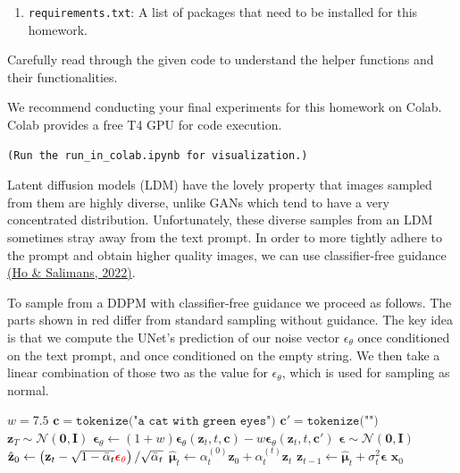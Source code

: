 \documentclass[11pt,addpoints,answers]{exam}
\newcommand{\Nc}{\mathcal{N}}
\newcommand{\cv}{\mathbf{c}}
\newcommand{\xv}{\mathbf{x}}
\newcommand{\zv}{\mathbf{z}}
\newcommand{\Iv}{\mathbf{I}}
\newcommand{\epsilonv   }{\boldsymbol \epsilon   }
\newcommand{\muv        }{\boldsymbol \mu        }
\begin{document}
\begin{questions}
\begin{enumerate}
    \item \lstinline{requirements.txt}: A list of packages that need to be installed for this homework.

\end{enumerate}

Carefully read through the given code to understand the helper functions and their functionalities. 


We recommend conducting your final experiments for this homework on Colab. Colab provides a free T4 GPU for code execution. 
\begin{lstlisting}
(Run the run_in_colab.ipynb for visualization.)
\end{lstlisting}



Latent diffusion models (LDM) have the lovely property that images sampled from them are highly diverse, unlike GANs which tend to have a very concentrated distribution. Unfortunately, these diverse samples from an LDM sometimes stray away from the text prompt. In order to more tightly adhere to the prompt and obtain higher quality images, we can use classifier-free guidance \href{https://arxiv.org/pdf/2207.12598}{(Ho \& Salimans, 2022)}.

To sample from a DDPM with classifier-free guidance we proceed as follows. The parts shown in red differ from standard sampling without guidance. The key idea is that we compute the UNet's prediction of our noise vector $\epsilon_{\theta}$ once conditioned on the text prompt, and once conditioned on the empty string. We then take a linear combination of those two as the value for $\epsilon_{\theta}$, which is used for sampling as normal. 
\begin{algorithm}[H]
\caption{Sampling from DDPM with Classifier-free Guidance}
\begin{algorithmic}[1]
\State \color{red} $w = 7.5$ 
\State $\cv = \texttt{tokenize("a cat with green eyes")}$ 
\State $\cv' = \texttt{tokenize("")}$  \color{black}
\State $\zv_T \sim \Nc(\mathbf{0}, \Iv)$
    \State \color{red} $\epsilonv_{\theta} \gets (1 + w) \epsilonv_{\theta}(\zv_t, t, \cv) - w \epsilonv_{\theta}(\zv_t, t, \cv') $ \color{black}
    \State $\epsilonv \sim \Nc(\mathbf{0}, \Iv)$
    \State $\hat{\zv}_0 \gets \left( \zv_t - \sqrt{1-\bar{\alpha}_t} {\color{red} \epsilonv_{\theta} } \right) / \sqrt{\bar{\alpha}_t}$ 
    \State $\hat{\muv}_t \gets  \alpha_t^{(0)} \hat{\zv}_0 + \alpha_t^{(t)} \zv_t $ 
    \State $\zv_{t-1} \gets \hat{\muv}_t  + \sigma_t^2 \epsilonv$
\EndFor
\State \Return $\xv_0$
\end{algorithmic}
\end{algorithm}


\end{questions}
\end{document}
